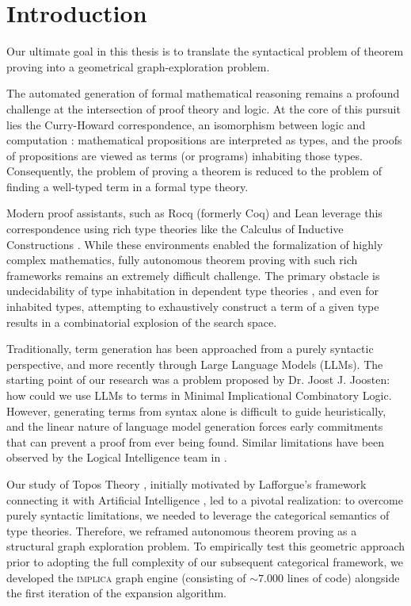 
\chapter*{Introduction}

Our ultimate goal in this thesis is to translate the syntactical problem of theorem proving into a geometrical graph-exploration problem.

The automated generation of formal mathematical reasoning remains a profound 
challenge at the intersection of proof theory and logic.
At the core of this pursuit lies the Curry-Howard correspondence,
an isomorphism between logic and computation \cite{howard}:
mathematical propositions are interpreted as types, and the proofs
of propositions are viewed as terms (or programs) inhabiting
those types. Consequently, the problem of proving a theorem is 
reduced to the problem of finding a well-typed term in a formal type theory.

Modern proof assistants, such as Rocq (formerly Coq) \cite{huet2000} and Lean \cite{demoura2015}
leverage this correspondence using rich type theories like the 
Calculus of Inductive Constructions \cite{coquand1990,paulin-mohring1993}. While these environments
enabled the formalization of highly complex mathematics, fully autonomous theorem
proving with such rich frameworks remains an extremely
difficult challenge. The primary obstacle is undecidability of 
type inhabitation in dependent type theories \cite{dowek1993}, and even for inhabited types, attempting
to exhaustively construct a term of a given type results in a 
combinatorial explosion of the search space.

Traditionally, term generation has been approached from a purely
syntactic perspective, and more recently through Large Language Models (LLMs).
The starting point of our research was a problem proposed by Dr. Joost J. Joosten:
how could we use LLMs to terms in Minimal Implicational Combinatory Logic.
However, generating terms from syntax alone is difficult to guide heuristically,
and the linear nature of language model generation forces early commitments 
that can prevent a proof from ever being found. Similar limitations 
have been observed by the Logical Intelligence team in \cite{logicalintelligence}.

Our study of Topos Theory \cite{lawvere1971}, initially motivated by Lafforgue's framework 
connecting it with Artificial Intelligence \cite{lafforgue2022,lafforgue2024}, led to a pivotal realization: 
to overcome purely syntactic limitations, we needed to leverage the categorical semantics of type 
theories. Therefore, we reframed autonomous theorem proving as a structural graph exploration problem. 
To empirically test this geometric approach prior to adopting the full complexity 
of our subsequent categorical framework, we developed the \textsc{implica} graph engine (consisting of $\sim 7.000$ lines of code) 
alongside the first iteration of the expansion algorithm.

